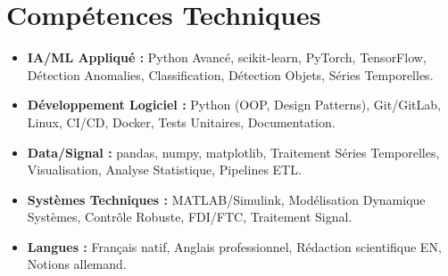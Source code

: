 \documentclass[a4paper,11pt]{article}
\begin{document}
\section{Comp\'etences Techniques}
\begin{itemize}[leftmargin=*, nosep]
    \item \small{\textbf{IA/ML Appliqu\'e :} Python Avanc\'e, scikit-learn, PyTorch, TensorFlow, D\'etection Anomalies, Classification, D\'etection Objets, S\'eries Temporelles.}
    \item \small{\textbf{D\'eveloppement Logiciel :} Python (OOP, Design Patterns), Git/GitLab, Linux, CI/CD, Docker, Tests Unitaires, Documentation.}
    \item \small{\textbf{Data/Signal :} pandas, numpy, matplotlib, Traitement S\'eries Temporelles, Visualisation, Analyse Statistique, Pipelines ETL.}
    \item \small{\textbf{Syst\`emes Techniques :} MATLAB/Simulink, Modélisation Dynamique Syst\`emes, Contr\^ole Robuste, FDI/FTC, Traitement Signal.}
    \item \small{\textbf{Langues :} Fran\c{c}ais natif, Anglais professionnel, R\'edaction scientifique EN, Notions allemand.}
\end{itemize}
\end{document}
